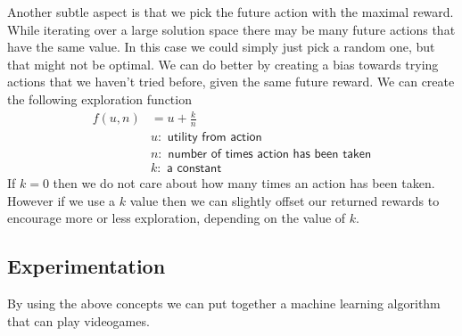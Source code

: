 \documentclass[12pt,letter]{article}
\begin{document}
Another subtle aspect is that we pick the future action with the maximal reward.
While iterating over a large solution space there may be many future actions that
have the same value. In this case we could simply just pick a random one, but
that might not be optimal. We can do better by creating a bias towards trying
actions that we haven't tried before, given the same future reward. We can
create the following exploration function
\begin{align*}
    f(u,n) &= u + \frac{k}{n}\\
    & u: \textsf{ utility from action}\\
    & n: \textsf{ number of times action has been taken}\\
    & k: \textsf{ a constant}
\end{align*}
If $k=0$ then we do not care about how many times an action has been taken. 
However if we use a $k$ value then we can slightly offset our returned rewards
to encourage more or less exploration, depending on the value of $k$. 

\subsection{Experimentation}
By using the above concepts we can put together a machine learning algorithm
that can play videogames. 
\end{document}
